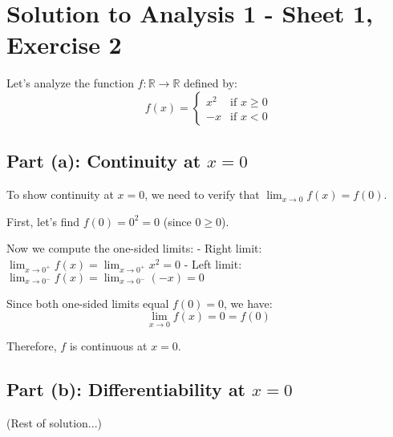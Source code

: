 \documentclass{article}
\begin{document}
\section*{Solution to Analysis 1 - Sheet 1, Exercise 2}

Let's analyze the function $f: \mathbb{R} \to \mathbb{R}$ defined by:
$$f(x) = \begin{cases}
x^2 & \text{if } x \geq 0 \\
-x & \text{if } x < 0
\end{cases}$$

\subsection*{Part (a): Continuity at $x = 0$}

To show continuity at $x = 0$, we need to verify that $\lim_{x \to 0} f(x) = f(0)$.

First, let's find $f(0) = 0^2 = 0$ (since $0 \geq 0$).

Now we compute the one-sided limits:
- Right limit: $\lim_{x \to 0^+} f(x) = \lim_{x \to 0^+} x^2 = 0$
- Left limit: $\lim_{x \to 0^-} f(x) = \lim_{x \to 0^-} (-x) = 0$

Since both one-sided limits equal $f(0) = 0$, we have:
$$\lim_{x \to 0} f(x) = 0 = f(0)$$

Therefore, $f$ is continuous at $x = 0$. 

\subsection*{Part (b): Differentiability at $x = 0$}

(Rest of solution...)
\end{document}
